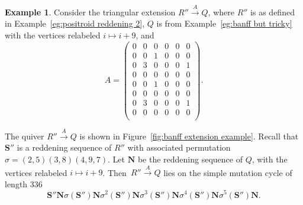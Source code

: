 \documentclass[11pt, letterpaper]{amsart}
\theoremstyle{definition}
\newtheorem{example}[theorem]{Example}
\numberwithin{equation}{section}
\begin{document}
\begin{example}
Consider the triangular extension $R'' \stackrel{A}{\rightarrow} Q$, where $R''$ is as defined in Example~\ref{eg:positroid reddening 2}, $Q$ is from Example~\ref{eg:banff but tricky} with the vertices relabeled $i \mapsto i+9$, and 
$$A = \begin{pmatrix}
0 & 0 & 0 & 0 & 0 &0 \\
0 & 0 & 1 & 0 & 0 &0 \\
0 & 3 & 0 & 0 & 0 &1 \\
0 & 0 & 0 & 0 & 0 &0 \\
0 & 0 & 1 & 0 & 0 &0 \\
0 & 0 & 0 & 0 & 0 &0 \\
0 & 3 & 0 & 0 & 0 &1 \\
0 & 0 & 0 & 0 & 0 &0 \\
\end{pmatrix}.$$

The quiver $R'' \stackrel{A}{\rightarrow} Q$ is shown in Figure~\ref{fig:banff extension example}. 
Recall that $\mathbf S''$ is a reddening sequence of $R''$ with associated permutation $\sigma = (2, 5) (3, 8) (4, 9, 7)$. 
Let $\mathbf N$ be the reddening sequence of $Q$, with the vertices relabeled $i \mapsto i+9$.
Then~$R'' \stackrel{A}{\rightarrow} Q$ lies on the simple mutation cycle of length $336$
$$\mathbf S'' \mathbf N \sigma(\mathbf S'') \mathbf N \sigma^2(\mathbf S'') \mathbf N \sigma^3(\mathbf S'') \mathbf N \sigma^4(\mathbf S'') \mathbf N \sigma^5(\mathbf S'') \mathbf N.$$


\end{example}
\end{document}
